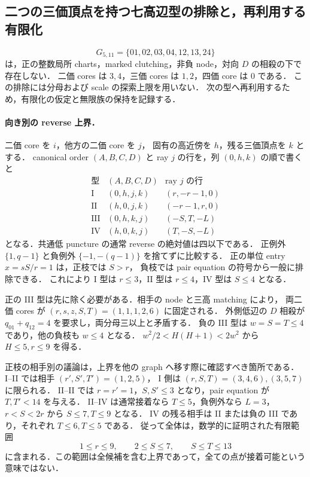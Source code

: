 \subsection{二つの三価頂点を持つ七高辺型の排除と，再利用する有限化}
\label{ng51120:obstruction}

\[
 G_{5,11}=\{01,02,03,04,12,13,24\}
\]
は，正の整数局所 charts，marked clutching，非負 node，対向 $D$ の相殺の下で存在しない．
二価 cores は $3,4$，三価 cores は $1,2$，四価 core は $0$ である．
この排除には分母および scale の探索上限を用いない．
次の型へ再利用するため，有限化の仮定と無限族の保持を記録する．

\paragraph{向き別の reverse 上界．}
二価 core を $i$，他方の二価 core を $j$，
固有の高近傍を $h$，残る三価頂点を $k$ とする．
canonical order $(A,B,C,D)$ と ray $j$ の行を，列 $(0,h,k)$ の順で書くと
\[
\begin{array}{c|c|c}
\text{型}&(A,B,C,D)&\text{ray }j\text{ の行}\\\hline
\mathrm I&(0,h,j,k)&(r,-r-1,0)\\
\mathrm {II}&(h,0,j,k)&(-r-1,r,0)\\
\mathrm {III}&(0,h,k,j)&(-S,T,-L)\\
\mathrm {IV}&(h,0,k,j)&(T,-S,-L)
\end{array}
\]
となる．共通低 puncture の通常 reverse の絶対値は四以下である．
正例外 $\{1,q-1\}$ と負例外 $\{-1,-(q-1)\}$ を捨てずに比較する．
正の単位 entry $x=sS/r=1$ は，正枝では $S>r$，
負枝では pair equation の符号から一般に排除できる．
これにより I 型は $r\le3$，II 型は $r\le4$，IV 型は $S\le4$ となる．

正の III 型は先に除く必要がある．相手の node と三高 matching により，
両二価 cores が $(r,s,z,S,T)=(1,1,1,2,6)$ に固定される．
外側低辺の $D$ 相殺が $q_{01}+q_{12}=4$ を要求し，両分母三以上と矛盾する．
負の III 型は $w=S=T\le4$ であり，他の負枝も $w\le4$ となる．
$w^2/2<H(H+1)<2w^2$ から $H\le5,r\le9$ を得る．

正枝の相手別の議論は，上界を他の graph へ移す際に確認すべき箇所である．
I--II では相手 $(r',S',T')=(1,2,5)$，
I 側は $(r,S,T)=(3,4,6),(3,5,7)$ に限られる．
II--II では $r=r'=1$，$S,S'\le3$ となり，pair equation が $T,T'<14$ を与える．
II--IV は通常接着なら $T\le5$，負例外なら $L=3$，
$r<S<2r$ から $S\le7,T\le9$ となる．
IV の残る相手は II または負の III であり，それぞれ $T\le6,T\le5$ である．
従って全体は，数学的に証明された有限範囲
\[
 1\le r\le9,\qquad 2\le S\le7,\qquad S\le T\le13
\]
に含まれる．この範囲は全候補を含む上界であって，全ての点が接着可能という意味ではない．


